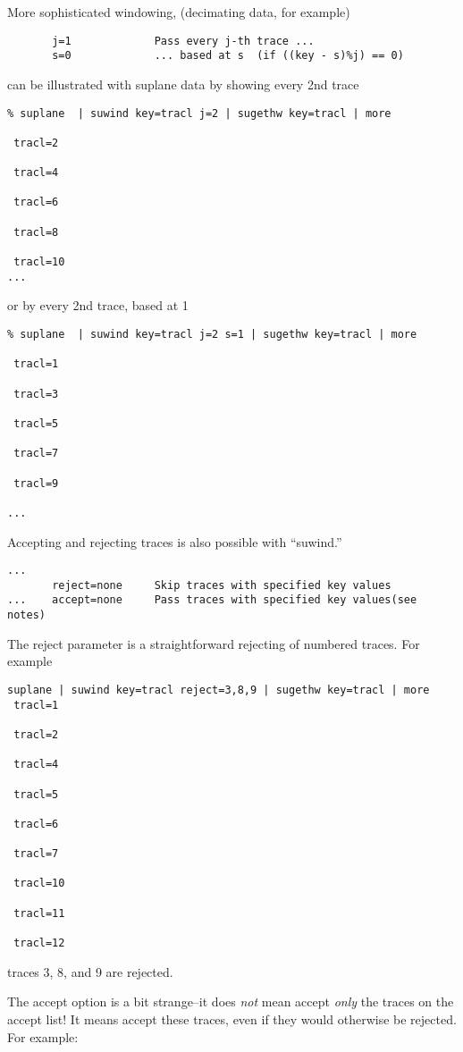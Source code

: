 {{{{{{{More sophisticated windowing, (decimating data, for example)
{\small \begin{verbatim}
       j=1             Pass every j-th trace ...                       
       s=0             ... based at s  (if ((key - s)%j) == 0)         
\end{verbatim}} \noindent
can be illustrated with suplane data by showing every 2nd trace
{\small \begin{verbatim}
% suplane  | suwind key=tracl j=2 | sugethw key=tracl | more

 tracl=2

 tracl=4

 tracl=6

 tracl=8

 tracl=10
...
\end{verbatim}} \noindent
or by every 2nd trace, based at 1
{\small \begin{verbatim}
% suplane  | suwind key=tracl j=2 s=1 | sugethw key=tracl | more

 tracl=1

 tracl=3

 tracl=5

 tracl=7

 tracl=9         

...
\end{verbatim} } \noindent

Accepting and rejecting traces is also possible with ``suwind.''

{\small \begin{verbatim}
...
       reject=none     Skip traces with specified key values           
...    accept=none     Pass traces with specified key values(see notes)
\end{verbatim} } \noindent
The reject parameter is a straightforward rejecting of numbered
traces.
For example
{\small \begin{verbatim}
suplane | suwind key=tracl reject=3,8,9 | sugethw key=tracl | more
 tracl=1

 tracl=2

 tracl=4

 tracl=5

 tracl=6

 tracl=7

 tracl=10

 tracl=11

 tracl=12    
\end{verbatim} } \noindent
traces 3, 8, and 9 are rejected.

The accept option is a bit strange--it does {\em not\/} mean
accept {\em only\/}
the traces on the accept list!  It means accept these traces,   
even if they would otherwise be rejected.
For example:

}}}}}}}
